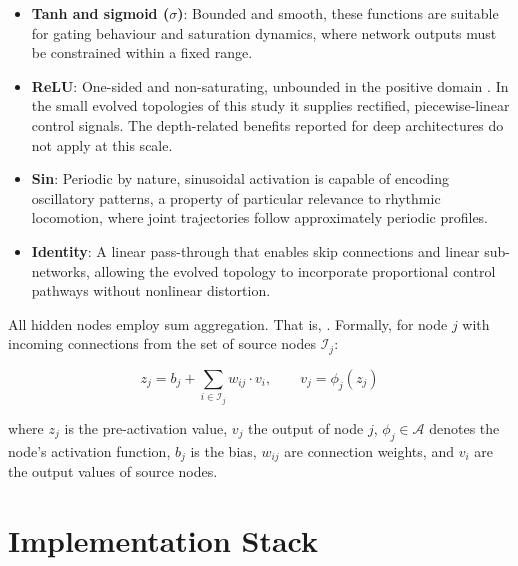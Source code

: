 \begin{itemize}
    \item \textbf{Tanh and sigmoid ($\sigma$)}: Bounded and smooth, these functions are suitable for gating behaviour and saturation dynamics, where network outputs must be constrained within a fixed range.
    \item \textbf{ReLU}: One-sided and non-saturating, unbounded in the positive domain \parencite{nair_rectified_2010}. In the small evolved topologies of this study it supplies rectified, piecewise-linear control signals. The depth-related benefits reported for deep architectures do not apply at this scale.
    \item \textbf{Sin}: Periodic by nature, sinusoidal activation is capable of encoding oscillatory patterns, a property of particular relevance to rhythmic locomotion, where joint trajectories follow approximately periodic profiles.
    \item \textbf{Identity}: A linear pass-through that enables skip connections and linear sub-networks, allowing the evolved topology to incorporate proportional control pathways without nonlinear distortion.
\end{itemize}


All hidden nodes employ sum aggregation.
That is, .
Formally, for node $j$ with incoming connections from the set of source nodes $\mathcal{I}_j$:

\[z_j = b_j + \sum_{i \in \mathcal{I}_j} w_{ij} \cdot v_i, \qquad v_j = \phi_j(z_j)\]

where $z_j$ is the pre-activation value, $v_j$ the output of node $j$, $\phi_j \in \mathcal{A}$ denotes the node's activation function, $b_j$ is the bias, $w_{ij}$ are connection weights, and $v_i$ are the output values of source nodes.

\section{Implementation Stack}
\label{subsec:implementation-stack}

